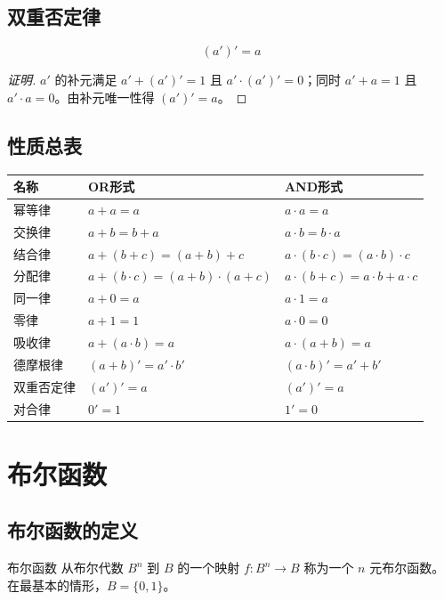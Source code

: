 \subsection{双重否定律}

\[
(a')' = a
\]

\begin{proof}[证明]
\(a'\) 的补元满足 \(a'+(a')'=1\) 且 \(a'\cdot(a')'=0\)；同时 \(a'+a=1\) 且 \(a'\cdot a=0\)。由补元唯一性得 \((a')'=a\)。
\end{proof}

\subsection{性质总表}

\begin{table}[H]
\centering
\small
\begin{tabular}{lll}
\toprule
名称 & OR形式 & AND形式 \\
\midrule
幂等律 & \(a+a=a\) & \(a\cdot a=a\) \\
交换律 & \(a+b=b+a\) & \(a\cdot b=b\cdot a\) \\
结合律 & \(a+(b+c)=(a+b)+c\) & \(a\cdot(b\cdot c)=(a\cdot b)\cdot c\) \\
分配律 & \(a+(b\cdot c)=(a+b)\cdot(a+c)\) & \(a\cdot(b+c)=a\cdot b+a\cdot c\) \\
同一律 & \(a+0=a\) & \(a\cdot 1=a\) \\
零律 & \(a+1=1\) & \(a\cdot 0=0\) \\
吸收律 & \(a+(a\cdot b)=a\) & \(a\cdot(a+b)=a\) \\
德摩根律 & \((a+b)'=a'\cdot b'\) & \((a\cdot b)'=a'+b'\) \\
双重否定律 & \((a')'=a\) & \((a')'=a\) \\
对合律 & \(0'=1\) & \(1'=0\) \\
\bottomrule
\end{tabular}
\end{table}

\section{布尔函数}

\subsection{布尔函数的定义}

\begin{mydefinition}{布尔函数}
从布尔代数 \(B^n\) 到 \(B\) 的一个映射 \(f: B^n \to B\) 称为一个 \(n\) 元布尔函数。在最基本的情形，\(B=\{0,1\}\)。
\end{mydefinition}

